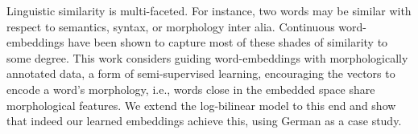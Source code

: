 Linguistic similarity is multi-faceted. For instance, two words may be similar with respect to semantics, syntax, or morphology inter alia. Continuous word-embeddings have been shown to capture most of these shades of similarity to some degree. This work considers guiding word-embeddings with morphologically annotated data, a form of semi-supervised learning, encouraging the vectors to encode a word's morphology, i.e., words close in the embedded space share morphological features. We extend the log-bilinear model to this end and show that indeed our learned embeddings achieve this, using German as a case study.
